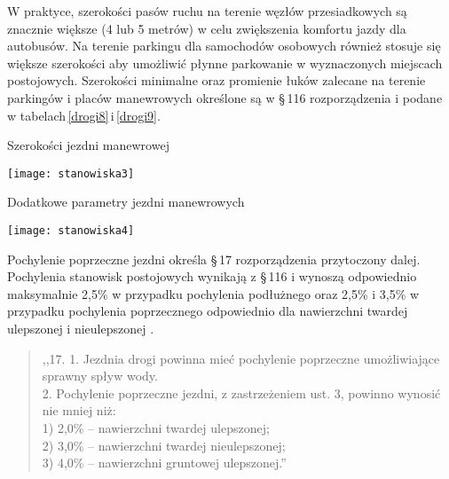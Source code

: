 \documentclass[twoside,12pt]{article}
\begin{document}
	W praktyce, szerokości pasów ruchu na terenie węzłów przesiadkowych są znacznie większe (4 lub 5 metrów) w celu zwiększenia komfortu jazdy dla autobusów. Na terenie parkingu dla samochodów osobowych również stosuje się większe szerokości aby umożliwić płynne parkowanie w wyznaczonych miejscach postojowych. Szerokości minimalne oraz promienie łuków zalecane na terenie parkingów i placów manewrowych określone są w §\,116 rozporządzenia i podane w tabelach\,\ref{drogi8}\,i\,\ref{drogi9}.
	\begin{table}[H]
		\centering
		\caption{Szerokości jezdni manewrowej}
		\texttt{[image: stanowiska3]}\\
		\label{drogi8}
	\end{table}
	
	\begin{table}[H]
		\centering
		\caption{Dodatkowe parametry jezdni manewrowych}
		\texttt{[image: stanowiska4]}\\
		\label{drogi9}
	\end{table}
	
	\begin{samepage}Pochylenie poprzeczne jezdni określa §\,17 rozporządzenia przytoczony dalej. Pochylenia stanowisk postojowych wynikają z §\,116 i wynoszą odpowiednio maksymalnie 2,5\% w przypadku pochylenia podłużnego oraz 2,5\% i 3,5\% w przypadku pochylenia poprzecznego odpowiednio dla nawierzchni twardej ulepszonej i nieulepszonej \cite{rozporzadzenie_drogi}.
		\begin{quote}
	 			,,17. 1. Jezdnia drogi powinna mieć pochylenie poprzeczne umożliwiające sprawny spływ wody.\\
				2. Pochylenie poprzeczne jezdni, z zastrzeżeniem ust. 3, powinno wynosić nie mniej niż:\\
				1) 2,0\% – nawierzchni twardej ulepszonej;\\
				2) 3,0\% – nawierzchni twardej nieulepszonej;\\
				3) 4,0\% – nawierzchni gruntowej ulepszonej.'' \cite{rozporzadzenie_drogi}
		\end{quote}\end{samepage}
	
\end{document}
